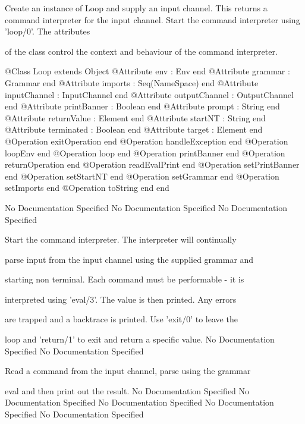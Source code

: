        Create an instance of Loop and supply an input channel.
       This returns a command interpreter for the input channel.
       Start the command interpreter using 'loop/0'. The attributes

       of the class control the context and behaviour of the 
       command interpreter.
\begin{Interface}
@Class Loop extends Object
  @Attribute env : Env end
  @Attribute grammar : Grammar end
  @Attribute imports : Seq(NameSpace) end
  @Attribute inputChannel : InputChannel end
  @Attribute outputChannel : OutputChannel end
  @Attribute printBanner : Boolean end
  @Attribute prompt : String end
  @Attribute returnValue : Element end
  @Attribute startNT : String end
  @Attribute terminated : Boolean end
  @Attribute target : Element end
  @Operation exitOperation end
  @Operation handleException end
  @Operation loopEnv end
  @Operation loop end
  @Operation printBanner end
  @Operation returnOperation end
  @Operation readEvalPrint end
  @Operation setPrintBanner end
  @Operation setStartNT end
  @Operation setGrammar end
  @Operation setImports end
  @Operation toString end
end
\end{Interface}
No Documentation Specified
No Documentation Specified
No Documentation Specified

         Start the command interpreter. The interpreter will continually

         parse input from the input channel using the supplied grammar and

         starting non terminal. Each command must be performable - it is

         interpreted using 'eval/3'. The value is then printed. Any errors

         are trapped and a backtrace is printed. Use 'exit/0' to leave the

         loop and 'return/1' to exit and return a specific value.
No Documentation Specified
No Documentation Specified

         Read a command from the input channel, parse using the grammar

         eval and then print out the result.
No Documentation Specified
No Documentation Specified
No Documentation Specified
No Documentation Specified
No Documentation Specified

